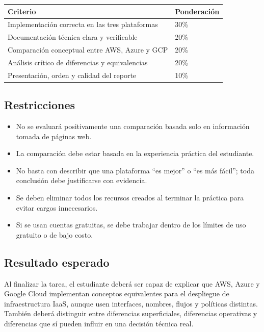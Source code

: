 \documentclass[
  coursetitle={Cómputo Nube y Tecnologías Emergentes},
  coursehours={96},
  coursedate={Verano 2026},
  doctype={Tarea 1},
  otherlangs={english,french},
  authorname={Lázaro},
  authorsurname={Bustio-Martínez},
  authortitle={PhD},
  role={Profesor Investigador},
  email={lbustio@inaoe.mx},
  phone={5559504000},
  ext={7459},
  institution={Instituto Nacional de Astrofísica, Óptica y Electrónica (INAOE)},
  department={Maestría en Ciencias en Tecnologías de Seguridad},
  address={Luis Enrique Erro 1, Sta. Ma. Tonantzintla, San Andrés Cholula, CP 72840, Puebla, México},
  margin={0.5in}
]{lbustio_lecture_notes}
\begin{document}
\begin{center}
\begin{tabular}{|p{}|p{}|}
\hline
\textbf{Criterio} & \textbf{Ponderación} \\
\hline
Implementación correcta en las tres plataformas & 30\% \\
\hline
Documentación técnica clara y verificable & 20\% \\
\hline
Comparación conceptual entre AWS, Azure y GCP & 20\% \\
\hline
Análisis crítico de diferencias y equivalencias & 20\% \\
\hline
Presentación, orden y calidad del reporte & 10\% \\
\hline
\end{tabular}
\end{center}

\subsection{Restricciones}
\label{sec:tarea1-restricciones}

\begin{itemize}
  \item No se evaluará positivamente una comparación basada solo en información tomada de páginas web.
  \item La comparación debe estar basada en la experiencia práctica del estudiante.
  \item No basta con describir que una plataforma ``es mejor'' o ``es más fácil''; toda conclusión debe justificarse con evidencia.
  \item Se deben eliminar todos los recursos creados al terminar la práctica para evitar cargos innecesarios.
  \item Si se usan cuentas gratuitas, se debe trabajar dentro de los límites de uso gratuito o de bajo costo.
\end{itemize}

\subsection{Resultado esperado}
\label{sec:tarea1-resultado}

Al finalizar la tarea, el estudiante deberá ser capaz de explicar que AWS, Azure y Google Cloud implementan conceptos equivalentes para el despliegue de infraestructura IaaS, aunque usen interfaces, nombres, flujos y políticas distintas. También deberá distinguir entre diferencias superficiales, diferencias operativas y diferencias que sí pueden influir en una decisión técnica real.
\end{document}

